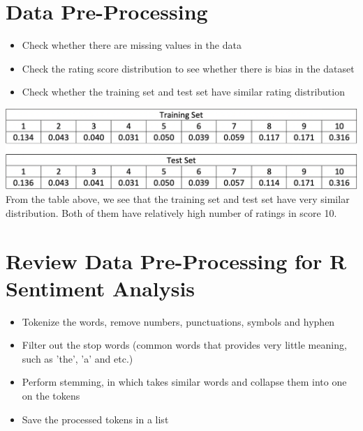 \documentclass{article}
\begin{document}
\section{Data Pre-Processing}
\begin{itemize}
  \item Check whether there are missing values in the data
  \item Check the rating score distribution to see whether there is bias in the dataset
  \item Check whether the training set and test set have similar rating distribution
\end{itemize}

\includegraphics[scale=0.33]{data_preprocessing_problemB.png}
\newline
From the table above, we see that the training set and test set have very 
similar distribution. Both of them have relatively high number of ratings 
in score 10. 

\section{Review Data Pre-Processing for R Sentiment Analysis}
\begin{itemize}
  \item Tokenize the words, remove numbers, punctuations, symbols and hyphen
  \item Filter out the stop words (common words that provides very little meaning, such as 'the', 'a' and etc.)
  \item Perform stemming, in which takes similar words and collapse them into one on the tokens
  \item Save the processed tokens in a list
\end{itemize}
\end{document}
